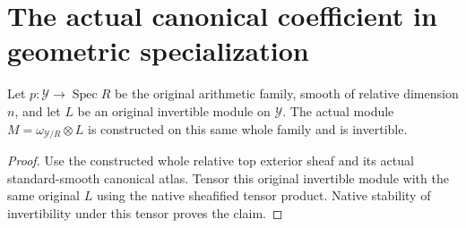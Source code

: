 \section{The actual canonical coefficient in geometric specialization}

\begin{lemma}
\label{lem:kn-arithmetic-canonical-specialization-model}
\leanok
{}
Let $p:\mathcal Y\to\operatorname{Spec}R$ be the original arithmetic family,
smooth of relative dimension $n$, and let $L$ be an original invertible
module on $\mathcal Y$.  The actual module
$M=\omega_{\mathcal Y/R}\otimes L$ is constructed on this same whole family
and is invertible.
\end{lemma}
\begin{proof}
Use the constructed whole relative top exterior sheaf and its actual
standard-smooth canonical atlas.  Tensor this original invertible module
with the same original $L$ using the native sheafified tensor product.
Native stability of invertibility under this tensor proves the claim.
\end{proof}

